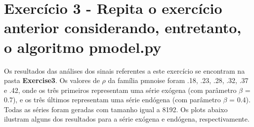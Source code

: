 
\section*{\large Exercício 3 - Repita o exercício anterior considerando, entretanto, o algoritmo pmodel.py}
%

Os resultados das análises dos sinais referentes a este exercício se encontram na pasta \textbf{Exercise3}. Os valores de $\rho$ da família pmnoise foram .18, .23, .28, .32, .37 e .42, onde os três primeiros representam uma série exógena (com parâmetro $\beta$ = 0.7), e os três últimos representam uma série endógena (com parâmetro $\beta$ = 0.4). Todas as séries foram geradas com tamanho igual a 8192. Os plots abaixo ilustram alguns dos resultados para a série exógena e endógena, respectivamente.

\begin{figure}[ht!]
	\vspace{0mm}	%
	\begin{center}
	\end{center}
	\vspace{-2mm}	%
	\label{ex3_fig1}
\end{figure}

